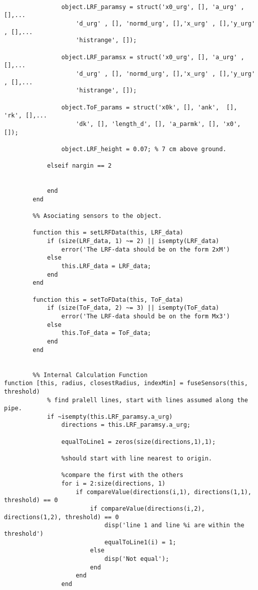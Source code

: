 \begin{lstlisting}
                
                object.LRF_paramsy = struct('x0_urg', [], 'a_urg' ,[],...
                    'd_urg' , [], 'normd_urg', [],'x_urg' , [],'y_urg' , [],...
                    'histrange', []);
                
                object.LRF_paramsx = struct('x0_urg', [], 'a_urg' ,[],...
                    'd_urg' , [], 'normd_urg', [],'x_urg' , [],'y_urg' , [],...
                    'histrange', []);
            
                object.ToF_params = struct('x0k', [], 'ank',  [], 'rk', [],...
                    'dk', [], 'length_d', [], 'a_parmk', [], 'x0', []);
                            
                object.LRF_height = 0.07; % 7 cm above ground.
                
            elseif nargin == 2
                
                
            end
        end
        
        %% Asociating sensors to the object.
        
        function this = setLRFData(this, LRF_data)
            if (size(LRF_data, 1) ~= 2) || isempty(LRF_data)
                error('The LRF-data should be on the form 2xM')
            else
                this.LRF_data = LRF_data;
            end
        end
        
        function this = setToFData(this, ToF_data)
            if (size(ToF_data, 2) ~= 3) || isempty(ToF_data) 
                error('The LRF-data should be on the form Mx3')
            else
                this.ToF_data = ToF_data; 
            end
        end
        
        
        %% Internal Calculation Function
function [this, radius, closestRadius, indexMin] = fuseSensors(this, threshold)
            % find pralell lines, start with lines assumed along the pipe.
            if ~isempty(this.LRF_paramsy.a_urg)
                directions = this.LRF_paramsy.a_urg;
                
                equalToLine1 = zeros(size(directions,1),1);
                
                %should start with line nearest to origin.
                
                %compare the first with the others
                for i = 2:size(directions, 1)
                    if compareValue(directions(i,1), directions(1,1), threshold) == 0
                        if compareValue(directions(i,2), directions(1,2), threshold) == 0
                            disp('line 1 and line %i are within the threshold')
                            equalToLine1(i) = 1;
                        else
                            disp('Not equal');
                        end
                    end
                end
                

\end{lstlisting}
